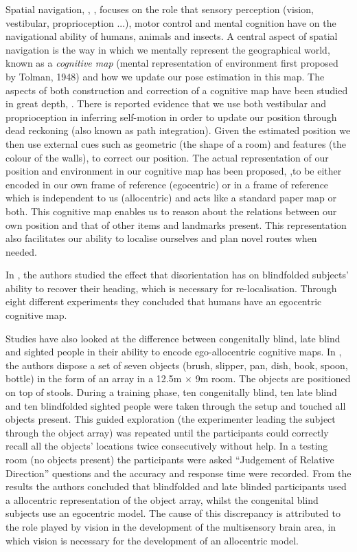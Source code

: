 Spatial navigation, \cite{Wang_2007}, \cite{what_det_our_nav_ability_2010}, focuses on the role that sensory perception 
(vision, vestibular, proprioception ...), motor control and mental cognition have on the navigational ability of  
humans, animals and insects. A central aspect of spatial navigation is the way in which we mentally represent the geographical world, known 
as a \textit{cognitive map} (mental representation of environment first proposed by Tolman, 1948) and how we update our pose estimation 
in this map. The aspects of both  construction and correction of a cognitive map have been studied in great depth, \cite{spatial_updating_2008}.
There is reported evidence that we use both vestibular and proprioception in inferring self-motion in order to update our position through dead reckoning (also known as path integration). 
Given the estimated position we then use external cues such as geometric (the shape of a room) and features (the colour of the walls), 
to correct our position. The actual representation of our position and environment in our cognitive map has been proposed,
\cite{spatial_memory_how_ego_allo_combine_2006},to be either encoded in our own frame of reference (egocentric) or in a frame of reference which 
is independent to us (allocentric) and acts like a standard paper map or both. This cognitive map enables us to reason about the relations between our own position and that of other items and landmarks present. 
This representation also facilitates our ability to localise ourselves and plan novel routes when needed.

In \cite{updating_egocentric_human_navigation_2000}, the authors studied the effect that disorientation has on blindfolded subjects' ability 
to recover their heading, which is necessary for re-localisation. Through eight different experiments they concluded that humans 
have an egocentric cognitive map.


Studies have also looked at the difference between congenitally blind, late blind and sighted people in their ability to encode ego-allocentric cognitive maps.
In \cite{Pasqualotto2013175}, the authors dispose a set of seven objects (brush, slipper, pan, dish, book, spoon, bottle) in the form of 
an array in a 12.5m $\times$ 9m room. The objects are positioned on top of stools. During a training phase, ten congenitally blind, ten late blind and ten blindfolded sighted people were taken through 
the setup and touched all objects present. This guided exploration (the experimenter leading the subject through the object array) was repeated until 
the participants could correctly recall all the objects' locations twice consecutively without help. In a testing room (no objects present) 
the participants were asked ``Judgement of Relative Direction''  questions and the accuracy and response time were recorded. From the results the authors 
concluded that blindfolded and late blinded participants used a allocentric representation of the object array, whilst the congenital blind 
subjects use an egocentric model. The cause of this discrepancy is attributed to the role played by vision in the development of the 
multisensory brain area, in which vision is necessary for the development of an allocentric model. 

